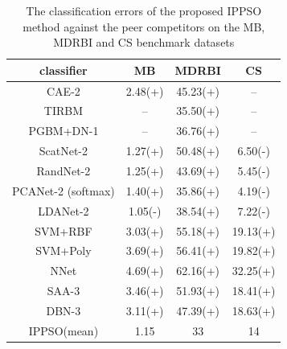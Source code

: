 \documentclass[conference]{IEEEtran}
\begin{document}
\begin{table}[!t]
	\renewcommand{\arraystretch}{1.3}
	\caption{The classification errors of the proposed IPPSO method against the peer competitors on the MB, MDRBI and CS benchmark datasets}
	\label{table:ResultComparison}
	\centering
	\begin{tabular}{|c|c|c|c|}
		\hline
		classiﬁer & MB & MDRBI & CS\\
		\hline
		CAE-2 & 2.48(+) & 45.23(+) & --\\
		\hline
		TIRBM & -- & 35.50(+) & --\\
		\hline
		PGBM+DN-1 & -- & 36.76(+) & --\\
		\hline
		ScatNet-2 & 1.27(+) & 50.48(+) & 6.50(-)\\
		\hline
		RandNet-2 & 1.25(+) & 43.69(+) & 5.45(-)\\
		\hline
		PCANet-2 (softmax)  & 1.40(+) & 35.86(+) & 4.19(-)\\
		\hline
		LDANet-2 & 1.05(-) & 38.54(+) & 7.22(-)\\
		\hline
		SVM+RBF & 3.03(+) & 55.18(+) & 19.13(+)\\
		\hline
		SVM+Poly & 3.69(+) & 56.41(+) & 19.82(+)\\
		\hline
		NNet & 4.69(+) & 62.16(+) & 32.25(+)\\
		\hline
		SAA-3 & 3.46(+) & 51.93(+) & 18.41(+)\\
		\hline
		DBN-3  & 3.11(+) & 47.39(+) & 18.63(+)\\
		\hline
		IPPSO(mean) & 1.15 & 33 & 14\\
		\hline
	\end{tabular}
\end{table}
\end{document}
